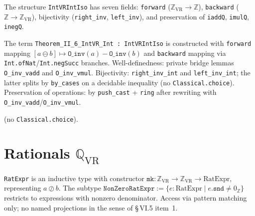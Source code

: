 \begin{definition}
\label{def:IntVRIntIso}
\leanok
{}
The structure \texttt{IntVRIntIso} has seven fields:
\texttt{forward} ($\mathbb{Z}_{\mathrm{VR}} \to \mathbb{Z}$),
\texttt{backward} ($\mathbb{Z} \to \mathbb{Z}_{\mathrm{VR}}$),
bijectivity (\texttt{right\_inv}, \texttt{left\_inv}), and
preservation of \texttt{iaddQ}, \texttt{imulQ}, \texttt{inegQ}.
\end{definition}

\begin{theorem}
\label{thm:T_II_6}
\leanok
{}
The term \texttt{Theorem\_II\_6\_IntVR\_Int : IntVRIntIso} is constructed with
\texttt{forward} mapping $[a \ominus b] \mapsto \texttt{O\_inv}(a) - \texttt{O\_inv}(b)$
and \texttt{backward} mapping via \texttt{Int.ofNat}/\texttt{Int.negSucc} branches.
Well-definedness: private bridge lemmas \texttt{O\_inv\_vadd} and \texttt{O\_inv\_vmul}.
Bijectivity: \texttt{right\_inv\_int} and \texttt{left\_inv\_int}; the latter
splits by \texttt{by\_cases} on a decidable inequality (no \texttt{Classical.choice}).
Preservation of operations: by \texttt{push\_cast} + \texttt{ring} after rewriting
with \texttt{O\_inv\_vadd}/\texttt{O\_inv\_vmul}.

\noindent{} (no \texttt{Classical.choice}).
\end{theorem}

\section{Rationals $\mathbb{Q}_{\mathrm{VR}}$}
\label{sec:rationals}

\begin{definition}
\label{def:RatExpr}
\leanok
{}
\texttt{RatExpr} is an inductive type with constructor
$\texttt{mk} : \mathbb{Z}_{\mathrm{VR}} \to \mathbb{Z}_{\mathrm{VR}} \to \mathrm{RatExpr}$,
representing $a \oslash b$.  The subtype
$\texttt{NonZeroRatExpr} := \{e : \mathrm{RatExpr} \mid e.\texttt{snd} \ne 0_{\mathbb{Z}}\}$
restricts to expressions with nonzero denominator.  Access via pattern matching
only; no named projections in the sense of §\,VI.5 item~1.
\end{definition}

